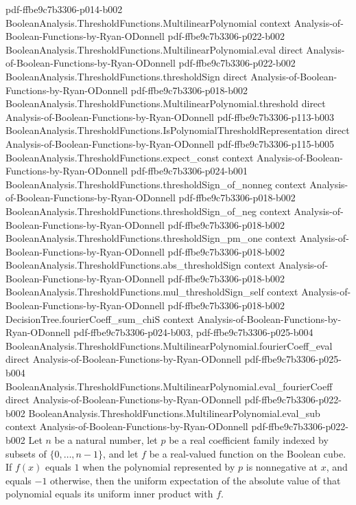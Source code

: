 \begin{lemma}
  {pdf-ffbe9c7b3306-p014-b002}
\proofstep
  {BooleanAnalysis.ThresholdFunctions.MultilinearPolynomial}
  {context}
  {Analysis-of-Boolean-Functions-by-Ryan-ODonnell}
  {pdf-ffbe9c7b3306-p022-b002}
\proofstep
  {BooleanAnalysis.ThresholdFunctions.MultilinearPolynomial.eval}
  {direct}
  {Analysis-of-Boolean-Functions-by-Ryan-ODonnell}
  {pdf-ffbe9c7b3306-p022-b002}
\proofstep
  {BooleanAnalysis.ThresholdFunctions.thresholdSign}
  {direct}
  {Analysis-of-Boolean-Functions-by-Ryan-ODonnell}
  {pdf-ffbe9c7b3306-p018-b002}
\proofstep
  {BooleanAnalysis.ThresholdFunctions.MultilinearPolynomial.threshold}
  {direct}
  {Analysis-of-Boolean-Functions-by-Ryan-ODonnell}
  {pdf-ffbe9c7b3306-p113-b003}
\proofstep
  {BooleanAnalysis.ThresholdFunctions.IsPolynomialThresholdRepresentation}
  {direct}
  {Analysis-of-Boolean-Functions-by-Ryan-ODonnell}
  {pdf-ffbe9c7b3306-p115-b005}
\proofstep
  {BooleanAnalysis.ThresholdFunctions.expect_const}
  {context}
  {Analysis-of-Boolean-Functions-by-Ryan-ODonnell}
  {pdf-ffbe9c7b3306-p024-b001}
\proofstep
  {BooleanAnalysis.ThresholdFunctions.thresholdSign_of_nonneg}
  {context}
  {Analysis-of-Boolean-Functions-by-Ryan-ODonnell}
  {pdf-ffbe9c7b3306-p018-b002}
\proofstep
  {BooleanAnalysis.ThresholdFunctions.thresholdSign_of_neg}
  {context}
  {Analysis-of-Boolean-Functions-by-Ryan-ODonnell}
  {pdf-ffbe9c7b3306-p018-b002}
\proofstep
  {BooleanAnalysis.ThresholdFunctions.thresholdSign_pm_one}
  {context}
  {Analysis-of-Boolean-Functions-by-Ryan-ODonnell}
  {pdf-ffbe9c7b3306-p018-b002}
\proofstep
  {BooleanAnalysis.ThresholdFunctions.abs_thresholdSign}
  {context}
  {Analysis-of-Boolean-Functions-by-Ryan-ODonnell}
  {pdf-ffbe9c7b3306-p018-b002}
\proofstep
  {BooleanAnalysis.ThresholdFunctions.mul_thresholdSign_self}
  {context}
  {Analysis-of-Boolean-Functions-by-Ryan-ODonnell}
  {pdf-ffbe9c7b3306-p018-b002}
\proofstep
  {DecisionTree.fourierCoeff_sum_chiS}
  {context}
  {Analysis-of-Boolean-Functions-by-Ryan-ODonnell}
  {pdf-ffbe9c7b3306-p024-b003,
    pdf-ffbe9c7b3306-p025-b004}
\proofstep
  {BooleanAnalysis.ThresholdFunctions.MultilinearPolynomial.fourierCoeff_eval}
  {direct}
  {Analysis-of-Boolean-Functions-by-Ryan-ODonnell}
  {pdf-ffbe9c7b3306-p025-b004}
\proofstep
  {BooleanAnalysis.ThresholdFunctions.MultilinearPolynomial.eval_fourierCoeff}
  {direct}
  {Analysis-of-Boolean-Functions-by-Ryan-ODonnell}
  {pdf-ffbe9c7b3306-p022-b002}
\proofstep
  {BooleanAnalysis.ThresholdFunctions.MultilinearPolynomial.eval_sub}
  {context}
  {Analysis-of-Boolean-Functions-by-Ryan-ODonnell}
  {pdf-ffbe9c7b3306-p022-b002}
Let $n$ be a natural number, let $p$ be a real coefficient family indexed by subsets of
$\{0,\ldots,n-1\}$, and let $f$ be a real-valued function on the Boolean cube. If $f(x)$
equals $1$ when the polynomial represented by $p$ is nonnegative at $x$, and equals $-1$
otherwise, then the uniform expectation of the absolute value of that polynomial equals
its uniform inner product with $f$.
\end{lemma}

